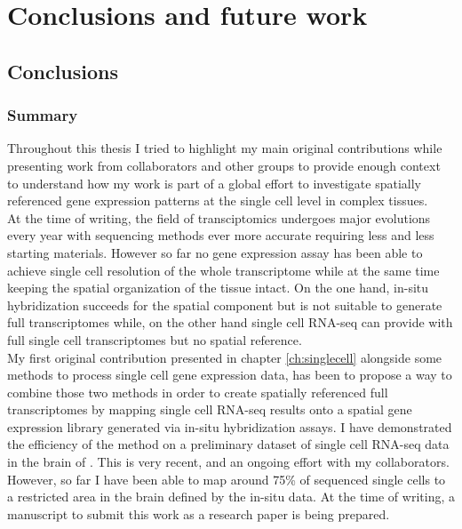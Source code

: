 \chapter{Conclusions and future work}\label{ch:conclusions}

\section{Conclusions}

	\subsection{Summary}
	
Throughout this thesis I tried to highlight my main original contributions while presenting work from collaborators and other groups to provide enough context to understand how my work is part of a global effort to investigate spatially referenced gene expression patterns at the single cell level in complex tissues.\\

At the time of writing, the field of transciptomics undergoes major evolutions every year with sequencing methods ever more accurate requiring less and less starting materials. However so far no gene expression assay has been able to achieve single cell resolution of the whole transcriptome while at the same time keeping the spatial organization of the tissue intact. On the one hand, in-situ hybridization succeeds for the spatial component but is not suitable to generate full transcriptomes while, on the other hand single cell RNA-seq can provide with full single cell transcriptomes but no spatial reference.\\

My first original contribution presented in chapter \ref{ch:singlecell} alongside some methods to process single cell gene expression data, has been to propose a way to combine those two methods in order to create spatially referenced full transcriptomes by mapping single cell RNA-seq results onto a spatial gene expression library generated via in-situ hybridization assays. I have demonstrated the efficiency of the method on a preliminary dataset of single cell RNA-seq data in the brain of \platy{}. This is very recent, and an ongoing effort with my collaborators. However, so far I have been able to map around 75\% of sequenced single cells to a restricted area in the brain defined by the in-situ data. At the time of writing, a manuscript to submit this work as a research paper is being prepared.\\

